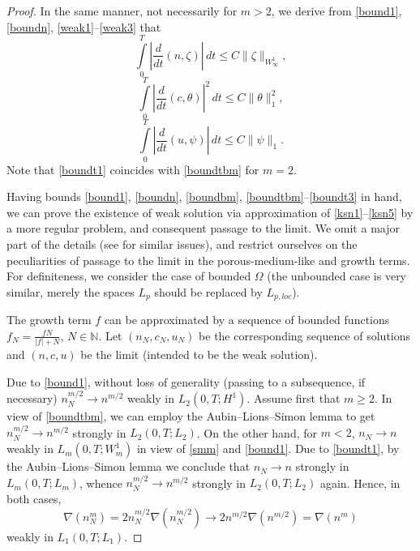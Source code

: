 \documentclass[10pt]{amsart}
\begin{document}
\begin{proof}
In the same manner, not necessarily for $m>2$, we derive from \eqref{bound1}, \eqref{boundn}, \eqref{weak1}--\eqref{weak3} that \begin{equation}\label{boundt1}\int\limits_0^T\left|\frac {d}{dt} (n,\zeta)\right|\,dt\leq C\|\zeta\|_{W^1_\infty},\end{equation}
\begin{equation}\label{boundt2}\int\limits_0^T\left|\frac {d}{dt} (c,\theta)\right|^2\,dt\leq C\|\theta\|_1^2,\end{equation}
\begin{equation}\label{boundt3}\int\limits_0^T\left|\frac {d}{dt} (u,\psi)\right|\,dt\leq C\|\psi\|_1.\end{equation}
Note that \eqref{boundt1} coincides with \eqref{boundtbm} for $m=2$. 

Having bounds \eqref{bound1},  \eqref{boundn}, \eqref{boundbm}, \eqref{boundtbm}--\eqref{boundt3} in hand, we can prove the existence of weak solution via approximation of \eqref{ksn1}--\eqref{ksn5} by a more regular problem, and consequent passage to the limit. We omit a major part of the details (see \cite{ckl11,flm10,dlm10,tw12} for similar issues), and restrict ourselves on the peculiarities of passage to the limit in the porous-medium-like and growth terms. For definiteness, we consider the case of bounded $\Omega$ (the unbounded case is very similar, merely the spaces $L_p$ should be replaced by $L_{p,loc}$). 

The growth term $f$ can be approximated by a sequence of bounded functions $f_N=\frac{fN}{|f|+N}$, $N\in \mathbb{N}$. Let $(n_N,c_N, u_N)$ be the corresponding sequence of solutions and $(n,c, u)$ be the limit (intended to be the weak solution). 

Due to \eqref{bound1}, without loss of generality (passing to a subsequence, if necessary) $n_N^{m/2}\to n^{m/2}$ weakly in $L_2(0,T; H^1)$. Assume first that $m\geq 2$.  In view of \eqref{boundtbm}, we can employ the Aubin--Lions--Simon lemma \cite{sim} to get $n_N^{m/2}\to n^{m/2}$ strongly in $L_2(0,T; L_2)$. On the other hand, for $m< 2$, $n_N\to n$ weakly in $L_{m}(0,T;W^1_{m})$ in view of \eqref{smm} and \eqref{bound1}. Due to \eqref{boundt1}, by the Aubin--Lions--Simon lemma we conclude that $n_N\to n$ strongly in $L_{m}(0,T;L_{m})$, whence $n_N^{m/2}\to n^{m/2}$ strongly in $L_2(0,T; L_2)$ again. Hence, in both cases, $$\nabla (n_N^m)= 2 n_N^{m/2} \nabla (n_N^{m/2}) \to 2 n^{m/2} \nabla (n^{m/2})= \nabla (n^m)$$ weakly in $L_1(0,T; L_1)$.


\end{proof}
\end{document}
